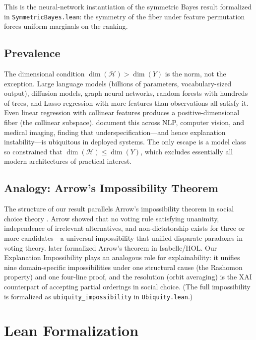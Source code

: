 \documentclass[twoside]{jmlr}
\newcommand{\sH}{\mathcal{H}}
\begin{document}
\noindent
This is the neural-network instantiation of the symmetric Bayes result
formalized in \texttt{SymmetricBayes.lean}: the symmetry of the fiber
under feature permutation forces uniform marginals on the ranking.

\subsection{Prevalence}
\label{sec:prevalence}

The dimensional condition $\dim(\sH) > \dim(Y)$ is the norm, not the
exception.  Large language models (billions of parameters, vocabulary-sized
output), diffusion models, graph neural networks, random forests with
hundreds of trees, and Lasso regression with more features than observations
all satisfy it.  Even linear regression with collinear features produces a
positive-dimensional fiber (the collinear subspace).
\citet{damour2022underspecification} document this across NLP, computer
vision, and medical imaging, finding that underspecification---and hence
explanation instability---is ubiquitous in deployed systems.  The only
escape is a model class so constrained that $\dim(\sH) \leq \dim(Y)$, which
excludes essentially all modern architectures of practical interest.

\subsection{Analogy: Arrow's Impossibility Theorem}
\label{sec:arrow-analogy}

The structure of our result parallels Arrow's impossibility theorem in social
choice theory \citep{arrow1951social}.  Arrow showed that no voting rule
satisfying unanimity, independence of irrelevant alternatives, and
non-dictatorship exists for three or more candidates---a universal
impossibility that unified disparate paradoxes in voting theory.
\citet{nipkow2009social} later formalized Arrow's theorem in Isabelle/HOL.
Our Explanation Impossibility plays an analogous role for
explainability: it unifies nine domain-specific impossibilities under one
structural cause (the Rashomon property) and one four-line proof, and the
resolution (orbit averaging) is the XAI counterpart of accepting partial
orderings in social choice.
(The full impossibility is formalized as \texttt{ubiquity\_impossibility}
in \texttt{Ubiquity.lean}.)

\section{Lean Formalization}
\label{sec:lean}
\end{document}
